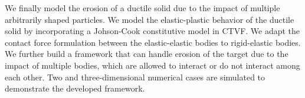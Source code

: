 \begin{Abstract}
  We finally model the erosion of a ductile solid due to the impact of multiple
  arbitrarily shaped particles. We model the elastic-plastic behavior of the
  ductile solid by incorporating a Johson-Cook constitutive model in CTVF. We
  adapt the contact force formulation between the elastic-elastic bodies to
  rigid-elastic bodies. We further build a framework that can handle erosion of
  the target due to the impact of multiple bodies, which are allowed to interact
  or do not interact among each other. Two and three-dimensional numerical cases
  are simulated to demonstrate the developed framework.

%
%
%
%
%
\end{Abstract}
